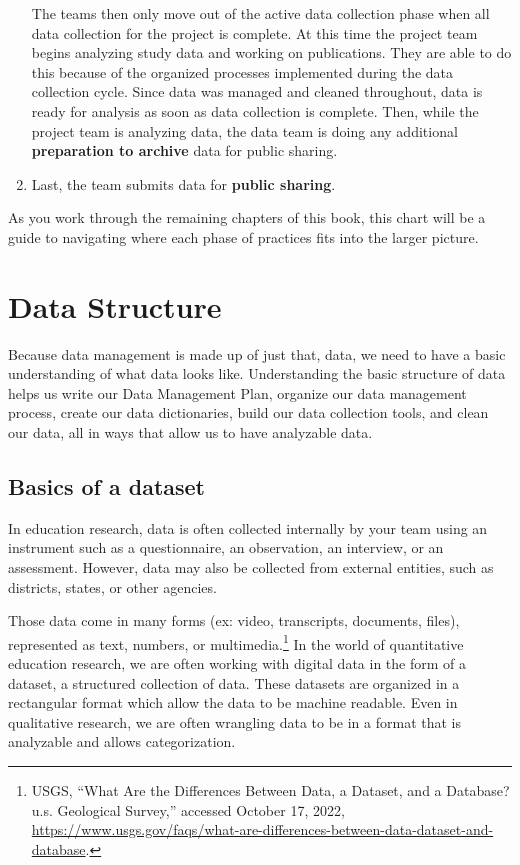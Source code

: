 \documentclass[
]{book}
\begin{document}
\begin{enumerate}
  The teams then only move out of the active data collection phase when all data collection for the project is complete. At this time the project team begins analyzing study data and working on publications. They are able to do this because of the organized processes implemented during the data collection cycle. Since data was managed and cleaned throughout, data is ready for analysis as soon as data collection is complete. Then, while the project team is analyzing data, the data team is doing any additional \textbf{preparation to archive} data for public sharing.
\item
  Last, the team submits data for \textbf{public sharing}.
\end{enumerate}

As you work through the remaining chapters of this book, this chart will be a guide to navigating where each phase of practices fits into the larger picture.

\hypertarget{data-structure}{%
\chapter{Data Structure}\label{data-structure}}

Because data management is made up of just that, data, we need to have a basic understanding of what data looks like. Understanding the basic structure of data helps us write our Data Management Plan, organize our data management process, create our data dictionaries, build our data collection tools, and clean our data, all in ways that allow us to have analyzable data.

\hypertarget{basics-of-a-dataset}{%
\section{Basics of a dataset}\label{basics-of-a-dataset}}

In education research, data is often collected internally by your team using an instrument such as a questionnaire, an observation, an interview, or an assessment. However, data may also be collected from external entities, such as districts, states, or other agencies.

Those data come in many forms (ex: video, transcripts, documents, files), represented as text, numbers, or multimedia.\footnote{USGS, {``What Are the Differences Between Data, a Dataset, and a Database? {\textbar} u.s. Geological Survey,''} accessed October 17, 2022, \url{https://www.usgs.gov/faqs/what-are-differences-between-data-dataset-and-database}.} In the world of quantitative education research, we are often working with digital data in the form of a dataset, a structured collection of data. These datasets are organized in a rectangular format which allow the data to be machine readable. Even in qualitative research, we are often wrangling data to be in a format that is analyzable and allows categorization.
\end{document}
